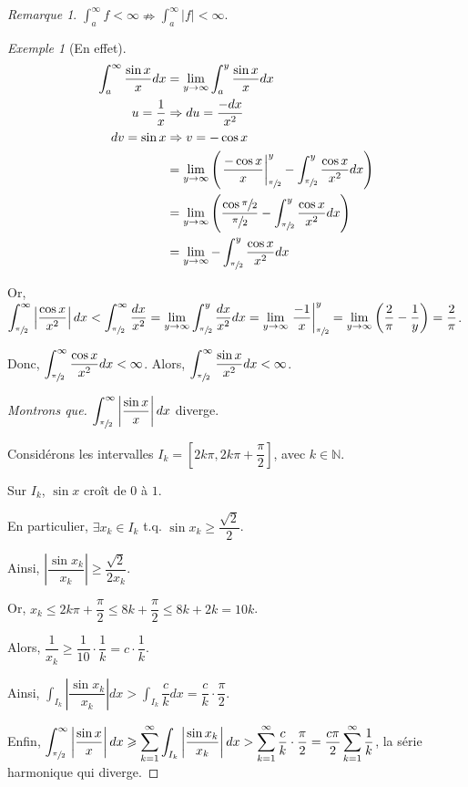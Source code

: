 \documentclass{report}
\newcommand*{\dsum}[4]{\displaystyle\sum_{#1=#2}^{#3}#4}
\newcommand*{\dlim}[3]{\displaystyle\lim_{#1 \to #2}#3}
\newcommand*{\dint}[3]{\displaystyle\int_{#1}^{#2}#3}
\newcommand*{\abs}[1]{\left| #1 \right|}
\newcommand*{\lte}{\leqslant}
\newcommand*{\gte}{\geqslant}
\newcommand*{\naturels}{\mathbb{N}}
\theoremstyle{definition}
\theoremstyle{remark}
\newtheorem*{exem}{Exemple}
\newtheorem*{rema}{Remarque}
\begin{document}
	\begin{rema}
		$\dint{a}{\infty}{f} < \infty \nRightarrow \dint{a}{\infty}{\abs{f}} < \infty$.
		\begin{exem}[En effet]
			\begin{align*}
				\dint{a}{\infty}{\dfrac{\sin x}{x} dx}&= \dlim{y}{\infty}{\dint{a}{y}{\dfrac{\sin x}{x} dx}}\\
				u=\frac{1}{x}&\Rightarrow du=\frac{-dx}{x^2}\\
				dv=\sin x&\Rightarrow v=-\cos x\\
				&= \dlim{y}{\infty} {\left( \left. \dfrac{-\cos x}{x} \right|^y_{\sfrac{\pi}{2}} - \dint{\sfrac{\pi}{2}}{y}{\dfrac{\cos x}{x^2} dx} \right)}\\
				&= \dlim{y}{\infty} {\left( \dfrac{\cos\sfrac{\pi}{2}}{\sfrac{\pi}{2}} - \dint{\sfrac{\pi}{2}}y{\dfrac{\cos x}{x^2} dx} \right)}\\
				&= \dlim{y}{\infty}{-\dint{\sfrac{\pi}{2}}{y}{\dfrac{\cos x}{x^2} dx}}
			\end{align*}

			Or, $\dint{\sfrac{\pi}{2}}{\infty}{\abs{\dfrac{\cos x}{x^2}} dx} < \dint{\sfrac{\pi}{2}}{\infty}{\dfrac{dx}{x^2}} = \dlim{y}{\infty}{\dint{\sfrac{\pi}{2}}y{\dfrac{dx}{x^2} dx}} = \dlim{y}{\infty} {\left. \dfrac{-1}{x} \right|^y_{\sfrac{\pi}{2}}} = \dlim{y}{\infty}{\left( \dfrac{2}{\pi} - \dfrac{1}{y} \right)} = \dfrac{2}{\pi}$.

			Donc, $\dint{\sfrac{\pi}{2}}{\infty}{\dfrac{\cos x}{x^2} dx} < \infty$. Alors, $\dint{\sfrac{\pi}{2}}{\infty}{\dfrac{\sin x}{x^2} dx} < \infty$.
			\begin{proof}[Montrons que]
				$\dint{\sfrac{\pi}{2}}{\infty}{\abs{\dfrac{\sin x}{x}} dx}$ diverge.

				Consid\'erons les intervalles $I_k = \left[ 2k\pi, 2k\pi+\dfrac{\pi}{2} \right]$, avec $k \in \naturels$.

				Sur $I_k$, $\sin x$ cro\^it de $0$ \`a $1$.

				En particulier, $\exists x_k \in I_k$ t.q. $\sin x_k \gte \dfrac{\sqrt{2}}{2}$.

				Ainsi, $\abs{\dfrac{\sin x_k}{x_k}} \gte \dfrac{\sqrt{2}}{2x_k}$.

				Or, $x_k \lte 2k\pi+\dfrac{\pi}{2} \lte 8k+\dfrac{\pi}{2} \lte 8k+2k = 10k$.

				Alors, $\dfrac{1}{x_k} \gte \dfrac{1}{10} \cdot \dfrac{1}{k} = c \cdot \dfrac{1}{k}$.

				Ainsi, $\dint{I_k}{}{\abs{\dfrac{\sin x_k}{x_k}} dx} >  \dint{I_k}{}{\dfrac{c}{k} dx} = \dfrac{c}{k} \cdot \dfrac{\pi}{2}$.

				Enfin, $\dint{\sfrac{\pi}{2}}{\infty}{\abs{\dfrac{\sin x}{x}} dx} \gte \dsum{k}{1}{\infty}{\dint{I_k}{}{\abs{\dfrac{\sin x_k}{x_k}} dx}} > \dsum{k}{1}{\infty}{\dfrac{c}{k} \cdot \dfrac{\pi}{2}} = \dfrac{c\pi}{2} \dsum{k}{1}{\infty}{\dfrac{1}{k}}$, la s\'erie harmonique qui diverge.
			\end{proof}
		\end{exem}
	\end{rema}
\end{document}
